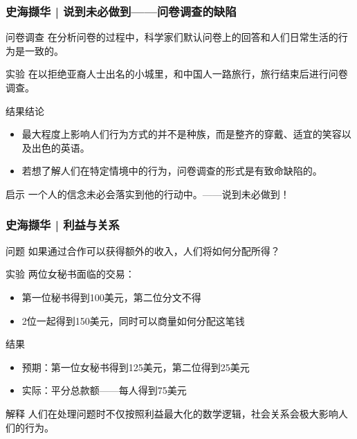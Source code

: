 \begin{frame}
  \frametitle{史海撷华 | 说到未必做到——问卷调查的缺陷}
  \begin{block}{问卷调查}
    在分析问卷的过程中，科学家们默认问卷上的回答和人们日常生活的行为是一致的。
  \end{block}
  \vspace{-0.5em}
  \pause
  \begin{block}{实验}
    在以拒绝亚裔人士出名的小城里，和中国人一路旅行，旅行结束后进行问卷调查。
  \end{block}
  \vspace{-0.5em}
  \pause
  \begin{block}{结果结论}
    \begin{itemize}
      \item 最大程度上影响人们行为方式的并不是种族，而是整齐的穿戴、适宜的笑容以及出色的英语。
      \item 若想了解人们在特定情境中的行为，问卷调查的形式是有致命缺陷的。
    \end{itemize}
  \end{block}
  \vspace{-0.5em}
  \pause
  \begin{block}{启示}
    一个人的信念未必会落实到他的行动中。——说到未必做到！
  \end{block}
\end{frame}

\begin{frame}
  \frametitle{史海撷华 | 利益与关系}
  \begin{block}{问题}
    如果通过合作可以获得额外的收入，人们将如何分配所得？
  \end{block}
  \vspace{-0.5em}
  \pause
  \begin{block}{实验}
    两位女秘书面临的交易：
    \begin{itemize}
      \item 第一位秘书得到100美元，第二位分文不得
      \item 2位一起得到150美元，同时可以商量如何分配这笔钱
    \end{itemize}
  \end{block}
  \vspace{-0.5em}
  \pause
  \begin{block}{结果}
    \begin{itemize}
      \item 预期：第一位女秘书得到125美元，第二位得到25美元
      \item 实际：平分总款额——每人得到75美元
    \end{itemize}
  \end{block}
  \vspace{-0.5em}
  \pause
  \begin{block}{解释}
    人们在处理问题时不仅按照利益最大化的数学逻辑，社会关系会极大影响人们的行为。
  \end{block}
\end{frame}

